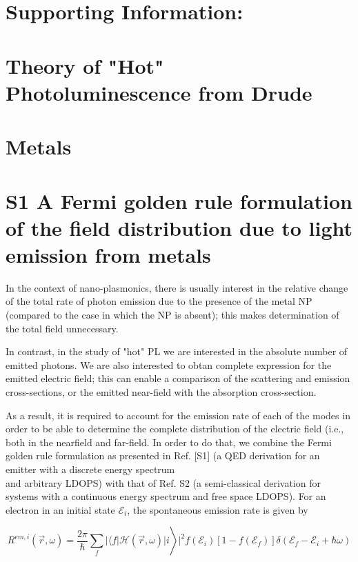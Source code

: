 \documentclass[10pt]{article}
\author{Yonatan Sivan ${ }^{*, \dagger}$ and Yonatan Dubi ${ }^{\ddagger}$\\
† School of Electrical and Computer Engineering, Ben-Gurion University of the Negev, Israel\\
‡ Department of Chemistry, Ben-Gurion University of the Negev, Israel\\
E-mail: sivanyon@bgu.ac.il}
\date{}
\begin{document}
\maketitle
\captionsetup{singlelinecheck=false}
\section*{Supporting Information:}
\section*{Theory of "Hot" Photoluminescence from Drude}
\section*{Metals}


\section*{S1 A Fermi golden rule formulation of the field distribution due to light emission from metals}
In the context of nano-plasmonics, there is usually interest in the relative change of the total rate of photon emission due to the presence of the metal NP (compared to the case in which the NP is absent); this makes determination of the total field unnecessary.

In contrast, in the study of "hot" PL we are interested in the absolute number of emitted photons. We are also interested to obtan complete expression for the emitted electric field; this can enable a comparison of the scattering and emission cross-sections, or the emitted near-field with the absorption cross-section.

As a result, it is required to account for the emission rate of each of the modes in order to be able to determine the complete distribution of the electric field (i.e., both in the nearfield and far-field. In order to do that, we combine the Fermi golden rule formulation as presented in Ref. [S1] (a QED derivation for an emitter with a discrete energy spectrum\\
and arbitrary LDOPS) with that of Ref. S2 (a semi-classical derivation for systems with a continuous energy spectrum and free space LDOPS). For an electron in an initial state $\mathcal{E}_{i}$, the spontaneous emission rate is given by


\begin{equation*}
\left.R^{e m, i}(\vec{r}, \omega)=\frac{2 \pi}{\hbar} \sum_{f}|\langle f| \mathcal{H}(\vec{r}, \omega)| i\right\rangle\left.\right|^{2} f\left(\mathcal{E}_{i}\right)\left[1-f\left(\mathcal{E}_{f}\right)\right] \delta\left(\mathcal{E}_{f}-\mathcal{E}_{i}+\hbar \omega\right) \tag{S1}
\end{equation*}
\end{document}
